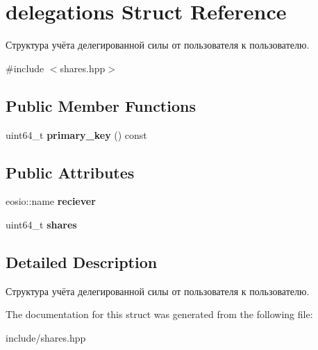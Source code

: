 \hypertarget{structdelegations}{}\section{delegations Struct Reference}
\label{structdelegations}


Структура учёта делегированной силы от пользователя к пользователю.  




{\ttfamily \#include $<$shares.\+hpp$>$}

\subsection*{Public Member Functions}
\begin{DoxyCompactItemize}
\item 
\mbox{\label{structdelegations_ac9b8c9b5d0dda7e6f9008cf1ba64b697}} 
uint64\+\_\+t {\bfseries primary\+\_\+key} () const
\end{DoxyCompactItemize}
\subsection*{Public Attributes}
\begin{DoxyCompactItemize}
\item 
\mbox{\label{structdelegations_a9a1bdcef11d0a6e16a408e2580cf2df7}} 
eosio\+::name {\bfseries reciever}
\item 
\mbox{\label{structdelegations_a7787306eec01bd3dace649a99a46adcd}} 
uint64\+\_\+t {\bfseries shares}
\end{DoxyCompactItemize}


\subsection{Detailed Description}
Структура учёта делегированной силы от пользователя к пользователю. 

The documentation for this struct was generated from the following file\+:\begin{DoxyCompactItemize}
\item 
include/shares.\+hpp\end{DoxyCompactItemize}
